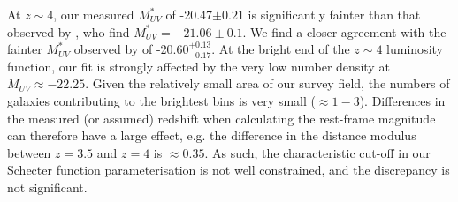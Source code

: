 At $z\sim4$, our measured $M_{UV}^{*}$ of -20.47$\pm 0.21$ is significantly fainter than that observed by \citet{2007ApJ...670..928B}, who find $M_{UV}^{*} = -21.06 \pm 0.1$. We find a closer agreement with the fainter $M_{UV}^{*}$ observed by \citet{Huang:2013kb} of -20.60$^{+0.13}_{-0.17}$.
At the bright end of the $z \sim 4$ luminosity function, our fit is strongly affected by the very low number density at $M_{UV} \approx -22.25$. Given the relatively small area of our survey field, the numbers of galaxies contributing to the brightest bins is very small ($\approx 1-3$). Differences in the measured (or assumed) redshift when calculating the rest-frame magnitude can therefore have a large effect, e.g. the difference in the distance modulus between $z = 3.5$ and $z = 4$ is $\approx 0.35$. As such, the characteristic cut-off in our Schecter function parameterisation is not well constrained, and the discrepancy is not significant.

